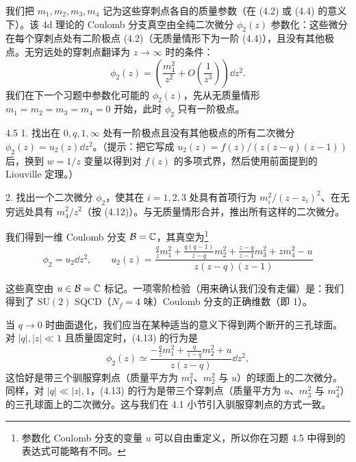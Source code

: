  我们把 $m_1,m_2,m_3,m_4$ 记为这些穿刺点各自的质量参数（在 (4.2) 或 (4.4) 的意义下）。该 4d 理论的 Coulomb 分支真空由全纯二次微分 $\phi_2(z)$ 参数化：这些微分在每个穿刺点处有二阶极点 (4.2)（无质量情形下为一阶 (4.4)），且没有其他极点。无穷远处的穿刺点翻译为 $z\to\infty$ 时的条件：
\begin{equation}
  \phi_2(z)=\left(\frac{m_4^2}{z^2}+O\!\left(\frac{1}{z^3}\right)\right)\dd z^2.
  \tag{4.12}
\end{equation}
我们在下一个习题中参数化可能的 $\phi_2(z)$，先从无质量情形 $m_1=m_2=m_3=m_4=0$ 开始，此时 $\phi_2$ 只有一阶极点。

\begin{exercise}{4.5}
1. 找出在 $0,q,1,\infty$ 处有一阶极点且没有其他极点的所有二次微分 $\phi_2(z)=u_2(z)\dd z^2$。（提示：把它写成 $u_2(z)=f(z)/(z(z-q)(z-1))$ 后，换到 $w=1/z$ 变量以得到对 $f(z)$ 的多项式界，然后使用前面提到的 Liouville 定理。）

2. 找出一个二次微分 $\phi_2$，使其在 $i=1,2,3$ 处具有首项行为 $m_i^2/(z-z_i)^2$、在无穷远处具有 $m_4^2/z^2$（按 (4.12)）。与无质量情形合并，推出所有这样的二次微分。
\end{exercise}

我们得到一维 Coulomb 分支 $\mathcal{B}=\mathbb{C}$，其真空为\footnote{参数化 Coulomb 分支的变量 $u$ 可以自由重定义，所以你在习题 4.5 中得到的表达式可能略有不同。}
\begin{equation}
  \phi_2=u_2\dd z^2,
  \qquad
  u_2(z)=\frac{\frac{q}{z}m_1^2+\frac{q(q-1)}{z-q}m_2^2+\frac{z-q}{z-1}m_3^2+zm_4^2-u}{z(z-q)(z-1)}
  \tag{4.13}
\end{equation}


这些真空由 $u\in\mathcal{B}=\mathbb{C}$ 标记。一项零阶检验（用来确认我们没有走偏）是：我们得到了 $\mathrm{SU}(2)$ SQCD（$N_f=4$ 味）Coulomb 分支的正确维数（即 1）。

 当 $q\to0$ 时曲面退化，我们应当在某种适当的意义下得到两个断开的三孔球面。对 $|q|,|z|\ll1$ 且质量固定时，(4.13) 的行为是
\begin{equation}
  \phi_2(z)\simeq
  \frac{-\frac{q}{z}m_1^2+\frac{q}{z-q}m_2^2+u}{z(z-q)}\dd z^2,
  \tag{4.14}
\end{equation}
这恰好是带三个驯服穿刺点（质量平方为 $m_1^2$、$m_2^2$ 与 $u$）的球面上的二次微分。同样，对 $|q|\ll|z|,1$，(4.13) 的行为是带三个穿刺点（质量平方为 $u$、$m_3^2$ 与 $m_4^2$）的三孔球面上的二次微分。这与我们在 4.1 小节引入驯服穿刺点的方式一致。

